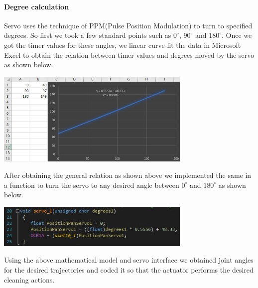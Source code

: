 \documentclass[12pt]{article}
\begin{document}
\paragraph{Degree calculation\\}
\noindent Servo uses the technique of PPM(Pulse Position Modulation) to turn to specified degrees. So first we took a few standard points such as $0^{\circ}$, $90^{\circ}$ and $180^{\circ}$. Once we got the timer values for these angles, we linear curve-fit the data in Microsoft Excel to obtain the relation between timer values and degrees moved by the servo as shown below.

\begin{center}
\includegraphics[width=0.7\textwidth]{18.jpg}
\end{center}

\noindent After obtaining the general relation as shown above we implemented the same in a function to turn the servo to any desired angle between $0^{\circ}$ and $180^{\circ}$ as shown below.

\begin{center}
\includegraphics[width=0.7\textwidth]{19.jpg}
\end{center}

\noindent Using the above mathematical model and servo interface we obtained joint angles for the desired trajectories and coded it so that the actuator performs the desired cleaning actions.
\end{document}
